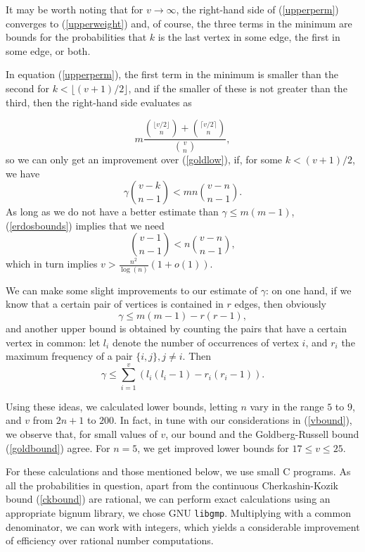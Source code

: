 \documentclass[a4paper,12pt]{article}
\begin{document}
It may be worth noting that for $v\to\infty$, the right-hand side of
(\ref{upperperm}) converges to (\ref{upperweight}) and, of course, the three
terms in the minimum are bounds for the probabilities that $k$ is the
last vertex in some edge, the first in some edge, or both.

In equation (\ref{upperperm}), the first term in the minimum is smaller
than the second for $k<\lfloor (v+1)/2\rfloor$, and if the smaller of these
is not greater than the third, then the right-hand side evaluates as

\[m\frac{\genfrac(){0pt}1{\lfloor v/2\rfloor}{n}
+\genfrac(){0pt}1{\lceil v/2\rceil}{n}}{\genfrac(){0pt}1{v}{n}},\]
so we can only get an improvement over (\ref{goldlow}), if, for some
$k<(v+1)/2$, we have
\[\gamma \genfrac (){0pt}0{v-k}{n-1}<mn\genfrac(){0pt}0{v-n}{n-1}.\]
As long as we do not have a better estimate than $\gamma\le m(m-1)$, 
(\ref{erdosbounds}) implies that we need 
\begin{equation}\label{vbound}
\genfrac(){0pt}0{v-1}{n-1}<n\genfrac(){0pt}0{v-n}{n-1},\end{equation}
which in turn implies $v>\frac{n^2}{\log(n)}(1+o(1))$. 

We can make some slight improvements to our estimate of $\gamma$: on one hand,
if we know that a certain pair of vertices is contained in $r$ edges, then
obviously
\[\gamma\le m(m-1)-r(r-1),\]
and another upper bound is obtained by counting the pairs that have a certain
vertex in common: let $l_i$ denote the number of occurrences of vertex $i$,
and $r_i$ the maximum frequency of a pair $\{i,j\}, j\neq i$. Then
\[\gamma\le\sum_{i=1}^v\left(l_i(l_i-1)-r_i(r_i-1)\right).\]

Using these ideas, we calculated lower bounds, letting $n$ vary in the range 
$5$ to $9$, and $v$ from $2n+1$ to $200$. In fact, in tune with our
considerations in (\ref{vbound}), we observe that, for small
values of $v$, our bound and the Goldberg-Russell bound (\ref{goldbound})
agree. For $n=5$, we get
improved lower bounds for $17\le v\le 25$.

For these calculations and those mentioned below, we use small C programs. As
all the probabilities in question, apart from the continuous Cherkashin-Kozik
bound (\ref{ckbound}) are rational, we can perform exact calculations using
an appropriate bignum library, we chose GNU {\tt libgmp}. Multiplying with
a common denominator, we can work with integers, which yields a considerable
improvement of efficiency over rational number computations.
\end{document}
